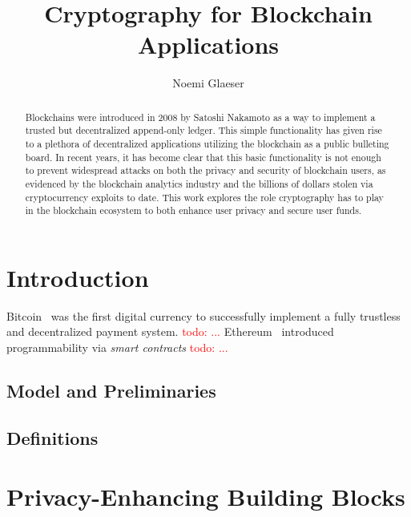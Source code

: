 \documentclass{article}
\title{Cryptography for Blockchain Applications}
\author{Noemi Glaeser}
\date{}
\newcommand{\noemi}[1]{\textcolor{magenta}{Noemi: #1}}
\newcommand{\todo}[1]{\textcolor{red}{todo: #1}}
\begin{document}
\maketitle
\begin{abstract}
Blockchains were introduced in 2008 by Satoshi Nakamoto as a way to implement a trusted but decentralized append-only ledger. This simple functionality has given rise to a plethora of decentralized applications utilizing the blockchain as a public bulleting board. In recent years, it has become clear that this basic functionality is not enough to prevent widespread attacks on both the privacy and security of blockchain users, as evidenced by the blockchain analytics industry and the billions of dollars stolen via cryptocurrency exploits to date. This work explores the role cryptography has to play in the blockchain ecosystem to both enhance user privacy and secure user funds.

\end{abstract}

\tableofcontents

\section{Introduction}

Bitcoin~\cite{bitcoin} was the first digital currency to successfully implement a fully trustless and decentralized payment system. \todo{...} Ethereum~\cite{ethereum} introduced programmability via \emph{smart contracts} \todo{...}

\subsection{Model and Preliminaries}
\subsection{Definitions}

\section{Privacy-Enhancing Building Blocks}\label{sec:building-blocks}
\end{document}
